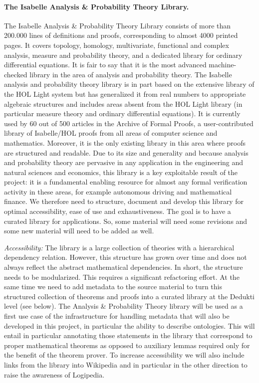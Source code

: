 \paragraph*{The Isabelle Analysis \& Probability Theory Library.}
The Isabelle Analysis \& Probability Theory Library consists of more
than 200.000 lines of definitions and proofs, corresponding to almost
4000 printed pages. It covers topology, homology, multivariate,
functional and complex analysis, measure and probability theory, and a
dedicated library for ordinary differential equations. It is fair to
say that it is the most advanced machine-checked library in the area
of analysis and probability theory. The Isabelle analysis and
probability theory library is in part based on the extensive library
of the HOL Light system but has generalized it from real numbers to
appropriate algebraic structures and includes areas absent from the
HOL Light library (in particular measure theory and ordinary
differential equations). It is currently used by 60 out of 500
articles in the Archive of Formal Proofs, a user-contributed library
of Isabelle/HOL proofs from all areas of computer science and
mathematics. Moreover, it is the only existing library in this area
where proofs are structured and readable. Due to its size and
generality and because analysis and probability theory are pervasive
in any application in the engineering and natural sciences and
economics, this library is a key exploitable result of the project: it
is a fundamental enabling resource for almost any formal verification
activity in these areas, for example autonomous driving and
mathematical finance. We therefore need to structure,
document and develop this library for optimal accessibility, ease of
use and exhaustiveness. The goal is to have a curated library for
applications. So, some material will need some revisions
and some new material will need to be added as well.

\emph{Accessibility:}
The library is a large collection of theories with a hierarchical dependency
relation. However, this structure has grown over time and does not always
reflect the abstract mathematical dependencies. In short, the structure needs
to be modularized. This requires a significant refactoring effort.
%
At the same time we need to add metadata to the source material to
turn this structured collection of theorems and proofs into a curated
library at the Dedukti level (see below). The Analysis \& Probability
Theory library will be used as a first use case of the infrastructure
for handling metadata that will also be developed in this project, in
particular the ability to describe ontologies.  This will entail in
particular annotating those statements in the library that correspond
to proper mathematical theorems as opposed to auxiliary lemmas
required only for the benefit of the theorem prover.  To increase
accessibility we will also include links from the library into
Wikipedia and in particular in the other direction to raise the
awareness of Logipedia.

